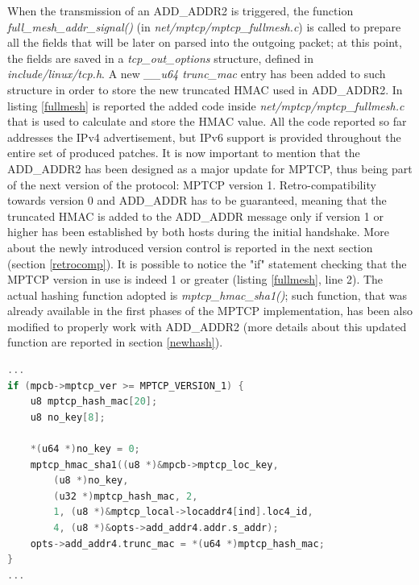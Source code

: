 When the transmission of an ADD\_ADDR2 is triggered, the function \textit{full\_mesh\_addr\_signal()} (in \textit{net/mptcp/mptcp\_fullmesh.c}) is called to prepare all the fields that will be later on parsed into the outgoing packet; at this point, the fields are saved in a \textit{tcp\_out\_options} structure, defined in \textit{include/linux/tcp.h}. A new \textit{\_\_u64 trunc\_mac} entry has been added to such structure in order to store the new truncated HMAC used in ADD\_ADDR2. 
In listing \ref{fullmesh} is reported the added code inside \textit{net/mptcp/mptcp\_fullmesh.c} that is used to calculate and store the HMAC value. All the code reported so far addresses the IPv4 advertisement, but IPv6 support is provided throughout the entire set of produced patches.
It is now important to mention that the ADD\_ADDR2 has been designed as a major update for MPTCP, thus being part of the next version of the protocol: MPTCP version 1. Retro-compatibility towards version 0 and ADD\_ADDR has to be guaranteed, meaning that the truncated HMAC is added to the ADD\_ADDR message only if version 1 or higher has been established by both hosts during the initial handshake. More about the newly introduced version control is reported in the next section (section \ref{retrocomp}). It is possible to notice the "if" statement checking that the MPTCP version in use is indeed 1 or greater (listing \ref{fullmesh}, line 2). The actual hashing function adopted is \textit{mptcp\_hmac\_sha1()}; such function, that was already available in the first phases of the MPTCP implementation, has been also modified to properly work with ADD\_ADDR2 (more details about this updated function are reported in section \ref{newhash}). 

\begin{lstlisting}[language=c, caption=\textit{New ADD\_ADDR HMAC calculation (outgoing packet, IPv4)}, label=fullmesh]
...
if (mpcb->mptcp_ver >= MPTCP_VERSION_1) {
	u8 mptcp_hash_mac[20];
	u8 no_key[8];

	*(u64 *)no_key = 0;
	mptcp_hmac_sha1((u8 *)&mpcb->mptcp_loc_key,
		(u8 *)no_key,
		(u32 *)mptcp_hash_mac, 2,
		1, (u8 *)&mptcp_local->locaddr4[ind].loc4_id,
		4, (u8 *)&opts->add_addr4.addr.s_addr);
	opts->add_addr4.trunc_mac = *(u64 *)mptcp_hash_mac;
}
...
\end{lstlisting}

